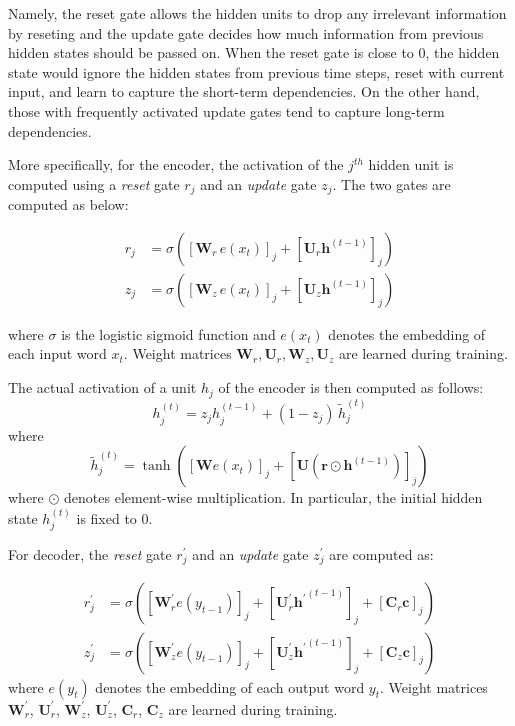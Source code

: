 \documentclass[11pt,letterpaper]{article}
\begin{document}
Namely, the reset gate allows the hidden units to drop any irrelevant information by reseting and the update gate decides how much information from previous hidden states should be passed on. When the reset gate is close to 0, the hidden state would ignore the hidden states from previous time steps, reset with current input, and learn to capture the short-term dependencies. On the other hand, those with frequently activated update gates tend to capture long-term dependencies.

More specifically, for the encoder, the activation of the $j^{th}$ hidden unit is computed using a \textit{reset} gate $r_j$ and an \textit{update} gate $z_j$. The two gates are computed as below:

\begin{equation}
\begin{split}
r_j &= \sigma \left({[\mathbf{W}_r\, e(x_t)]}_j + {[\mathbf{U}_r \mathbf{h}^{(t-1)}]}_j \right) \\
z_j &= \sigma \left({[\mathbf{W}_z\, e(x_t)]}_j + {[\mathbf{U}_z \mathbf{h}^{(t-1)}]}_j \right)
\end{split}
\end{equation}

where $\sigma$ is the logistic sigmoid function and $e(x_t)$ denotes the embedding of each input word $x_t$. Weight matrices $\mathbf{W}_r, \mathbf{U}_r, \mathbf{W}_z, \mathbf{U}_z$ are learned during training.

The actual activation of a unit $h_j$ of the encoder is then computed as follows:
\begin{equation}
h_j^{(t)} = z_j h_j^{(t-1)} + (1-z_j)\, \tilde{h}_j^{(t)}  
\end{equation}
where 
\begin{equation}
\tilde{h}_j^{(t)} = \tanh \left( {[\mathbf{W} e(x_t)]}_j +{[\mathbf{U} (\mathbf{r} \odot \mathbf{h}^{(t-1)})]}_j \right)
\end{equation}
where $\odot$ denotes element-wise multiplication. In particular, the initial hidden state $h_j^{(t)}$ is fixed to 0.

For decoder, the \textit{reset} gate $r_j^\prime$ and an \textit{update} gate $z_j^\prime$ are computed as:

\begin{equation}
\begin{split}
r_j^\prime &= \sigma \left({[\mathbf{W}_r^\prime e(y_{t-1})]}_j + {[\mathbf{U}_r^\prime {\mathbf{h}^\prime}^{(t-1)}]}_j + {[\mathbf{C}_r \mathbf{c}]}_j \right) \\
z_j^\prime &= \sigma \left({[\mathbf{W}_z^\prime e(y_{t-1})]}_j + {[\mathbf{U}_z^\prime {\mathbf{h}^\prime}^{(t-1)}]}_j + {[\mathbf{C}_z \mathbf{c}]}_j \right)
\end{split}
\end{equation}
where $e(y_{t})$ denotes the embedding of each output word $y_t$. Weight matrices $\mathbf{W}_r^\prime$, $\mathbf{U}_r^\prime$, $\mathbf{W}_z^\prime$, $\mathbf{U}_z^\prime$, $\mathbf{C}_r$, $\mathbf{C}_z$ are learned during training.
\end{document}

